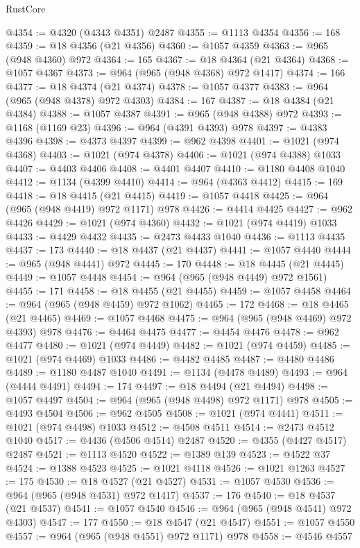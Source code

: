 \begin{lexlean}{RustCore}
\begin{coremodule}
@4354 := @4320 (@4343 @4351) @2487
@4355 := @1113 @4354
@4356 := 168
@4359 := @18 @4356 (@21 @4356)
@4360 := @1057 @4359
@4363 := @965 (@948 @4360) @972
@4364 := 165
@4367 := @18 @4364 (@21 @4364)
@4368 := @1057 @4367
@4373 := @964 (@965 (@948 @4368) @972 @1417)
@4374 := 166
@4377 := @18 @4374 (@21 @4374)
@4378 := @1057 @4377
@4383 := @964 (@965 (@948 @4378) @972 @4303)
@4384 := 167
@4387 := @18 @4384 (@21 @4384)
@4388 := @1057 @4387
@4391 := @965 (@948 @4388) @972
@4393 := @1168 (@1169 @23)
@4396 := @964 (@4391 @4393) @978
@4397 := @4383 @4396
@4398 := @4373 @4397
@4399 := @962 @4398
@4401 := @1021 (@974 @4368)
@4403 := @1021 (@974 @4378)
@4406 := @1021 (@974 @4388) @1033
@4407 := @4403 @4406
@4408 := @4401 @4407
@4410 := @1180 @4408 @1040
@4412 := @1134 (@4399 @4410)
@4414 := @964 (@4363 @4412)
@4415 := 169
@4418 := @18 @4415 (@21 @4415)
@4419 := @1057 @4418
@4425 := @964 (@965 (@948 @4419) @972 @1171) @978
@4426 := @4414 @4425
@4427 := @962 @4426
@4429 := @1021 (@974 @4360)
@4432 := @1021 (@974 @4419) @1033
@4433 := @4429 @4432
@4435 := @2473 @4433 @1040
@4436 := @1113 @4435
@4437 := 173
@4440 := @18 @4437 (@21 @4437)
@4441 := @1057 @4440
@4444 := @965 (@948 @4441) @972
@4445 := 170
@4448 := @18 @4445 (@21 @4445)
@4449 := @1057 @4448
@4454 := @964 (@965 (@948 @4449) @972 @1561)
@4455 := 171
@4458 := @18 @4455 (@21 @4455)
@4459 := @1057 @4458
@4464 := @964 (@965 (@948 @4459) @972 @1062)
@4465 := 172
@4468 := @18 @4465 (@21 @4465)
@4469 := @1057 @4468
@4475 := @964 (@965 (@948 @4469) @972 @4393) @978
@4476 := @4464 @4475
@4477 := @4454 @4476
@4478 := @962 @4477
@4480 := @1021 (@974 @4449)
@4482 := @1021 (@974 @4459)
@4485 := @1021 (@974 @4469) @1033
@4486 := @4482 @4485
@4487 := @4480 @4486
@4489 := @1180 @4487 @1040
@4491 := @1134 (@4478 @4489)
@4493 := @964 (@4444 @4491)
@4494 := 174
@4497 := @18 @4494 (@21 @4494)
@4498 := @1057 @4497
@4504 := @964 (@965 (@948 @4498) @972 @1171) @978
@4505 := @4493 @4504
@4506 := @962 @4505
@4508 := @1021 (@974 @4441)
@4511 := @1021 (@974 @4498) @1033
@4512 := @4508 @4511
@4514 := @2473 @4512 @1040
@4517 := @4436 (@4506 @4514) @2487
@4520 := @4355 (@4427 @4517) @2487
@4521 := @1113 @4520
@4522 := @1389 @139
@4523 := @4522 @37
@4524 := @1388 @4523
@4525 := @1021 @4118
@4526 := @1021 @1263
@4527 := 175
@4530 := @18 @4527 (@21 @4527)
@4531 := @1057 @4530
@4536 := @964 (@965 (@948 @4531) @972 @1417)
@4537 := 176
@4540 := @18 @4537 (@21 @4537)
@4541 := @1057 @4540
@4546 := @964 (@965 (@948 @4541) @972 @4303)
@4547 := 177
@4550 := @18 @4547 (@21 @4547)
@4551 := @1057 @4550
@4557 := @964 (@965 (@948 @4551) @972 @1171) @978
@4558 := @4546 @4557

\end{coremodule}
\end{lexlean}
